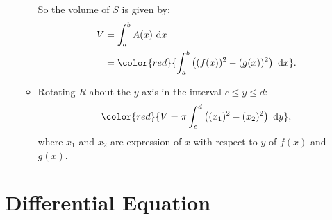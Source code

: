 \documentclass[12pt, a4paper]{article}
\def\d{{\mathrm{d}}}
\begin{document}
\begin{enumerate}
\begin{itemize}
        So the volume of $S$ is given by: 
        $$\begin{aligned}
            V&=\int_a^bA(x)\ \d x\\
            &={\color{red}{\int_a^b\left((f(x))^2-(g(x))^2\right)\ \d x}}.
        \end{aligned}$$
        \item Rotating $R$ about the $y$-axis in the interval $c\leq y\leq d$: 
        $${\color{red}{V=\pi\int_c^d\left((x_1)^2-(x_2)^2\right)\ \d y}},$$
        where $x_1$ and $x_2$ are expression of $x$ with respect to $y$ of $f(x)$ and $g(x)$.
    \end{itemize}
\end{enumerate}

\section{Differential Equation}
\end{document}
